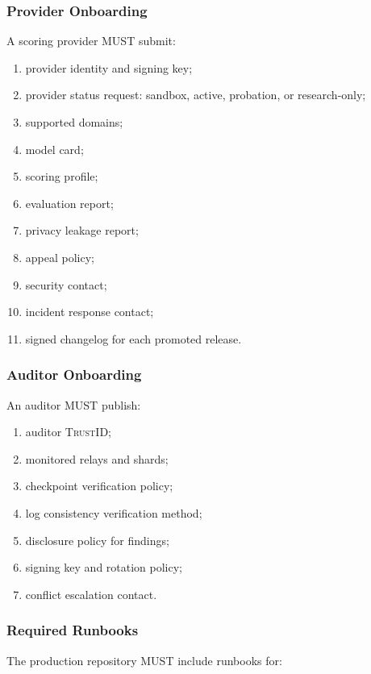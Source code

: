 \documentclass[11pt]{article}
\newcommand{\TrustID}{\textsc{TrustID}}
\begin{document}
\subsubsection{Provider Onboarding}

A scoring provider MUST submit:

\begin{enumerate}
    \item provider identity and signing key;
    \item provider status request: sandbox, active, probation, or research-only;
    \item supported domains;
    \item model card;
    \item scoring profile;
    \item evaluation report;
    \item privacy leakage report;
    \item appeal policy;
    \item security contact;
    \item incident response contact;
    \item signed changelog for each promoted release.
\end{enumerate}

\subsubsection{Auditor Onboarding}

An auditor MUST publish:

\begin{enumerate}
    \item auditor \TrustID{};
    \item monitored relays and shards;
    \item checkpoint verification policy;
    \item log consistency verification method;
    \item disclosure policy for findings;
    \item signing key and rotation policy;
    \item conflict escalation contact.
\end{enumerate}

\subsubsection{Required Runbooks}

The production repository MUST include runbooks for:
\end{document}

